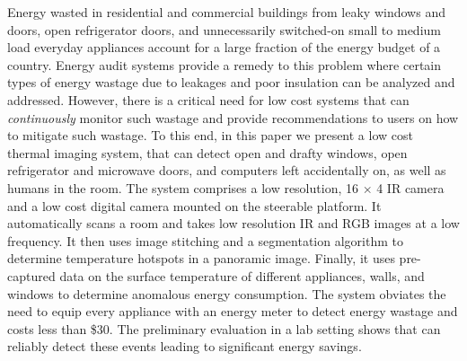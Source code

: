 Energy wasted in residential and commercial buildings from leaky windows and doors, open refrigerator doors, and unnecessarily switched-on small to medium load everyday appliances account for a large fraction of the energy budget of a country. Energy audit systems provide a remedy to this problem where certain types of energy wastage due to leakages and poor insulation can be analyzed and addressed. However, there is a critical need for low cost systems that can {\em continuously} monitor such wastage and provide recommendations to users on how to mitigate such wastage. To this end, in this paper we present a low cost thermal imaging system, {\IRLeak} that can detect open and drafty windows, open refrigerator and microwave doors, and computers left accidentally on, as well as humans in the room. The system comprises a low resolution, 16 $\times$ 4 IR camera and a low cost digital camera mounted on the steerable platform. It automatically scans a room and takes low resolution IR and RGB images at a low frequency. It then uses image stitching and a segmentation algorithm to determine temperature hotspots in a panoramic image. Finally, it uses pre-captured data on the surface temperature of different appliances, walls, and windows to determine anomalous energy consumption. The system obviates the need to equip every appliance with an energy meter to detect energy wastage and costs less than \$30. The preliminary evaluation in a lab setting shows that {\IRLeak} can reliably detect these events leading to significant energy savings.

